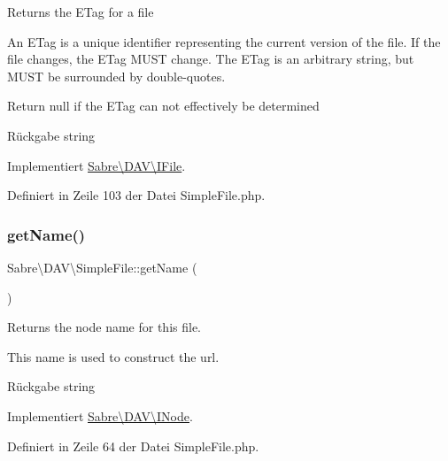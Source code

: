 Returns the E\+Tag for a file

An E\+Tag is a unique identifier representing the current version of the file. If the file changes, the E\+Tag M\+U\+ST change. The E\+Tag is an arbitrary string, but M\+U\+ST be surrounded by double-\/quotes.

Return null if the E\+Tag can not effectively be determined \begin{DoxyReturn}{Rückgabe}
string 
\end{DoxyReturn}


Implementiert \mbox{\hyperlink{interface_sabre_1_1_d_a_v_1_1_i_file_a2b207a6037dcbd4e7373b977dc60117f}{Sabre\textbackslash{}\+D\+A\+V\textbackslash{}\+I\+File}}.



Definiert in Zeile 103 der Datei Simple\+File.\+php.

\mbox{\label{class_sabre_1_1_d_a_v_1_1_simple_file_a57c28fd3a5bd1437a816030ba46111b6}} 
\subsubsection{\texorpdfstring{get\+Name()}{getName()}}
{\footnotesize\ttfamily Sabre\textbackslash{}\+D\+A\+V\textbackslash{}\+Simple\+File\+::get\+Name (\begin{DoxyParamCaption}{ }\end{DoxyParamCaption})}

Returns the node name for this file.

This name is used to construct the url.

\begin{DoxyReturn}{Rückgabe}
string 
\end{DoxyReturn}


Implementiert \mbox{\hyperlink{interface_sabre_1_1_d_a_v_1_1_i_node_ab616fe836b1ae36af12126a2bc934dce}{Sabre\textbackslash{}\+D\+A\+V\textbackslash{}\+I\+Node}}.



Definiert in Zeile 64 der Datei Simple\+File.\+php.

\mbox{\label{class_sabre_1_1_d_a_v_1_1_simple_file_a1fa9715d7dda56738289e186923dd2b1}} 

